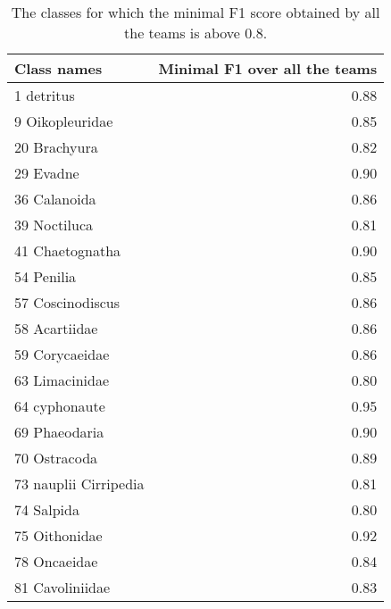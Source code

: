 
\begin{table}
\begin{tabular}{|l|r|}
Class names & Minimal F1 over all the teams \\
        \hline
1 detritus & 0.88\\ 
9 Oikopleuridae & 0.85\\ 
20 Brachyura & 0.82\\ 
29 Evadne & 0.90\\ 
36 Calanoida & 0.86\\ 
39 Noctiluca & 0.81\\ 
41 Chaetognatha & 0.90\\ 
54 Penilia & 0.85\\ 
57 Coscinodiscus & 0.86\\ 
58 Acartiidae & 0.86\\ 
59 Corycaeidae & 0.86\\ 
63 Limacinidae & 0.80\\ 
64 cyphonaute & 0.95\\ 
69 Phaeodaria & 0.90\\ 
70 Ostracoda & 0.89\\ 
73 nauplii Cirripedia & 0.81\\ 
74 Salpida & 0.80\\ 
75 Oithonidae & 0.92\\ 
78 Oncaeidae & 0.84\\ 
81 Cavoliniidae & 0.83
\end{tabular}
\caption{\label{table:best_predicted} The classes for which the minimal F1 score obtained by all the teams is above
$0.8$.}
\end{table}
                